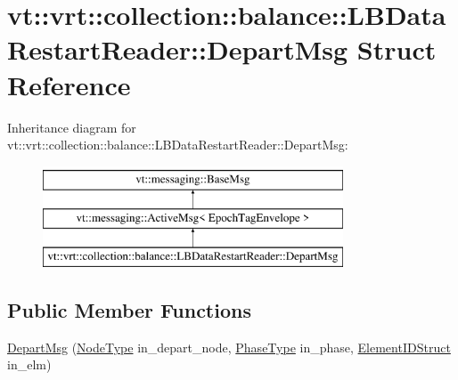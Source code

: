\hypertarget{structvt_1_1vrt_1_1collection_1_1balance_1_1_l_b_data_restart_reader_1_1_depart_msg}{}\section{vt\+:\+:vrt\+:\+:collection\+:\+:balance\+:\+:L\+B\+Data\+Restart\+Reader\+:\+:Depart\+Msg Struct Reference}
\label{structvt_1_1vrt_1_1collection_1_1balance_1_1_l_b_data_restart_reader_1_1_depart_msg}
Inheritance diagram for vt\+:\+:vrt\+:\+:collection\+:\+:balance\+:\+:L\+B\+Data\+Restart\+Reader\+:\+:Depart\+Msg\+:\begin{figure}[H]
\begin{center}
\leavevmode
\includegraphics[height=3.000000cm]{structvt_1_1vrt_1_1collection_1_1balance_1_1_l_b_data_restart_reader_1_1_depart_msg}
\end{center}
\end{figure}
\subsection*{Public Member Functions}
\begin{DoxyCompactItemize}
\item 
\hyperlink{structvt_1_1vrt_1_1collection_1_1balance_1_1_l_b_data_restart_reader_1_1_depart_msg_ae15909d6d9849206bcde8611ed200d29}{Depart\+Msg} (\hyperlink{namespacevt_a866da9d0efc19c0a1ce79e9e492f47e2}{Node\+Type} in\+\_\+depart\+\_\+node, \hyperlink{namespacevt_a46ce6733d5cdbd735d561b7b4029f6d7}{Phase\+Type} in\+\_\+phase, \hyperlink{namespacevt_1_1vrt_1_1collection_1_1balance_a9f5b53fafb270212279a4757d2c4cd28}{Element\+I\+D\+Struct} in\+\_\+elm)
\end{DoxyCompactItemize}
